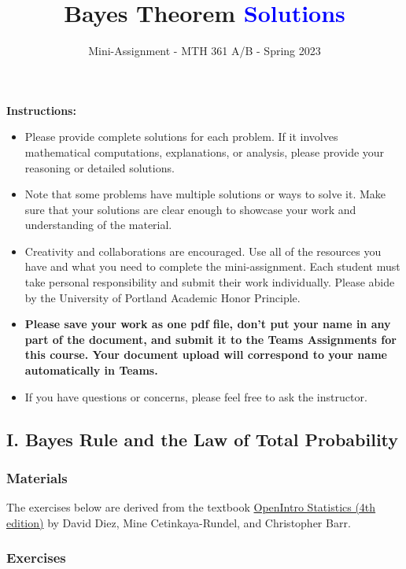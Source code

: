 \documentclass[
]{article}
\title{\textbf{Bayes Theorem \textcolor{blue}{Solutions}}}
\subtitle{Mini-Assignment - MTH 361 A/B - Spring 2023}
\author{}
\date{\vspace{-2.5em}}
\begin{document}
\maketitle

\hfill\break

\textbf{Instructions:}

\begin{itemize}
\item
  Please provide complete solutions for each problem. If it involves mathematical computations, explanations, or analysis, please provide your reasoning or detailed solutions.
\item
  Note that some problems have multiple solutions or ways to solve it. Make sure that your solutions are clear enough to showcase your work and understanding of the material.
\item
  Creativity and collaborations are encouraged. Use all of the resources you have and what you need to complete the mini-assignment. Each student must take personal responsibility and submit their work individually. Please abide by the University of Portland Academic Honor Principle.
\item
  \textbf{Please save your work as one pdf file, don't put your name in any part of the document, and submit it to the Teams Assignments for this course. Your document upload will correspond to your name automatically in Teams.}
\item
  If you have questions or concerns, please feel free to ask the instructor.
\end{itemize}

\newpage

\hypertarget{i.-bayes-rule-and-the-law-of-total-probability}{%
\subsection{I. Bayes Rule and the Law of Total Probability}\label{i.-bayes-rule-and-the-law-of-total-probability}}

\hypertarget{materials}{%
\subsubsection{Materials}\label{materials}}

The exercises below are derived from the textbook \href{https://www.openintro.org/book/os/}{OpenIntro Statistics (4th edition)} by David Diez, Mine Cetinkaya-Rundel, and Christopher Barr.

\hypertarget{exercises}{%
\subsubsection{Exercises}\label{exercises}}
\end{document}
